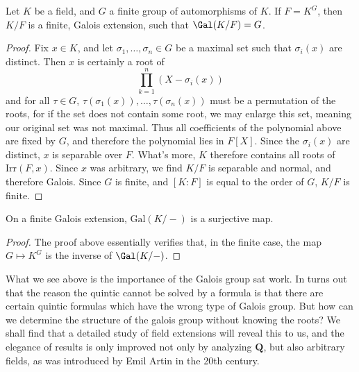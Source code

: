 \begin{theorem}
    Let $K$ be a field, and $G$ a finite group of automorphisms of $K$. If $F = K^G$, then $K/F$ is a finite, Galois extension, such that $\Gal(K/F) = G$.
\end{theorem}
\begin{proof}
    Fix $x \in K$, and let $\sigma_1, \dots, \sigma_n \in G$ be a maximal set such that $\sigma_i(x)$ are distinct. Then $x$ is certainly a root of
    \[ \prod_{k = 1}^n (X - \sigma_i(x)) \]
    and for all $\tau \in G$, $\tau(\sigma_1(x)), \dots, \tau(\sigma_n(x))$ must be a permutation of the roots, for if the set does not contain some root, we may enlarge this set, meaning our original set was not maximal. Thus all coefficients of the polynomial above are fixed by $G$, and therefore the polynomial lies in $F[X]$. Since the $\sigma_i(x)$ are distinct, $x$ is separable over $F$. What's more, $K$ therefore contains all roots of $\text{Irr}(F,x)$. Since $x$ was arbitrary, we find $K/F$ is separable and normal, and therefore Galois. Since $G$ is finite, and $[K:F]$ is equal to the order of $G$, $K/F$ is finite.
\end{proof}

\begin{corollary}
    On a finite Galois extension, $\text{Gal}(K/-)$ is a surjective map.
\end{corollary}
\begin{proof}
    The proof above essentially verifies that, in the finite case, the map $G \mapsto K^G$ is the inverse of $\Gal(K/-)$.
\end{proof}











What we see above is the importance of the Galois group sat work. In turns out that the reason the quintic cannot be solved by a formula is that there are certain quintic formulas which have the wrong type of Galois group. But how can we determine the structure of the galois group without knowing the roots? We shall find that a detailed study of field extensions will reveal this to us, and the elegance of results is only improved not only by analyzing $\mathbf{Q}$, but also arbitrary fields, as was introduced by Emil Artin in the 20th century.

